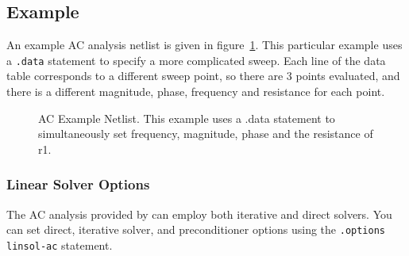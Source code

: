 \subsection{Example}
An example AC analysis netlist is given in figure~\ref{acExample}.
This particular example uses a \texttt{.data} statement to specify a
more complicated sweep.  Each line of the data table corresponds to a
different sweep point, so there are 3 points evaluated, and there is a
different magnitude, phase, frequency and resistance for each point.
\begin{figure}[htbp]
  \begin{centering}
\caption[AC Example Netlist]
{AC Example Netlist.  This example uses a .data statement to simultaneously set frequency, magnitude, phase and the resistance of r1. \label{acExample} }
\end{centering}
\end{figure}

\subsubsection{Linear Solver Options}

The AC analysis provided by \Xyce{} can employ both iterative and
direct solvers. You can set direct, iterative
solver, and preconditioner options using the \verb|.options linsol-ac|
statement.


